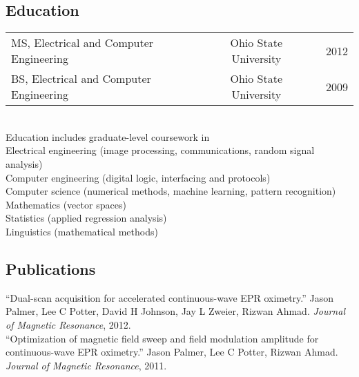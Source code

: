 \documentclass[12pt]{report}
\makeatletter
\renewcommand{\bullet}{$\vcenter{\hbox{~\huge$\cdot$~}}$}
\newenvironment{bullets}
{\tabularx{\textwidth}{ @{\bullet} X @{} }}
{\endtabularx}
\makeatother
\begin{document}
\subsection*{Education}
\begin{tabularx}{\textwidth}{ @{\bullet} l X c X r @{} }
MS, Electrical and Computer Engineering && Ohio State University && 2012 \\
BS, Electrical and Computer Engineering && Ohio State University && 2009 \\
\end{tabularx}
\newline \\
Education includes graduate-level coursework in \\
\begin{bullets}
Electrical engineering (image processing, communications, random signal analysis) \\
Computer engineering (digital logic, interfacing and protocols) \\
Computer science (numerical methods, machine learning, pattern recognition) \\
Mathematics (vector spaces) \\
Statistics (applied regression analysis) \\
Linguistics (mathematical methods) \\
\end{bullets}

\subsection*{Publications}
\begin{bullets}
``Dual-scan acquisition for accelerated continuous-wave EPR oximetry.''
Jason Palmer, Lee C Potter, David H Johnson, Jay L Zweier, Rizwan Ahmad.
{\it Journal of Magnetic Resonance}, 2012. \\
``Optimization of magnetic field sweep and field modulation amplitude for continuous-wave EPR oximetry.''
Jason Palmer, Lee C Potter, Rizwan Ahmad.
{\it Journal of Magnetic Resonance}, 2011. \\
\end{bullets}
\end{document}
